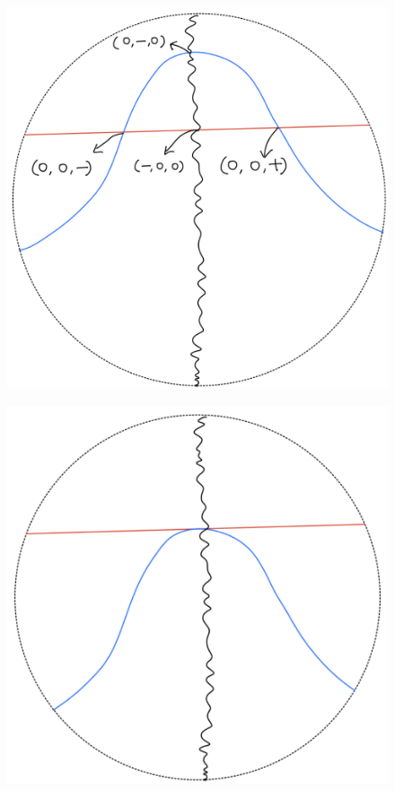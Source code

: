 \begin{definition}
\begin{enumerate}
\begin{itemize}
\begin{figure}[H]
    \centering
    \includegraphics[scale = 0.45]{diagrams/lemma3/13.png} 
    \caption{}
    \label{fig:your-label}
\end{figure}
\begin{figure}[H]
    \centering
    \includegraphics[scale = 0.45]{diagrams/lemma3/14.png} 

\end{figure}
\end{itemize}
\end{enumerate}
\end{definition}
